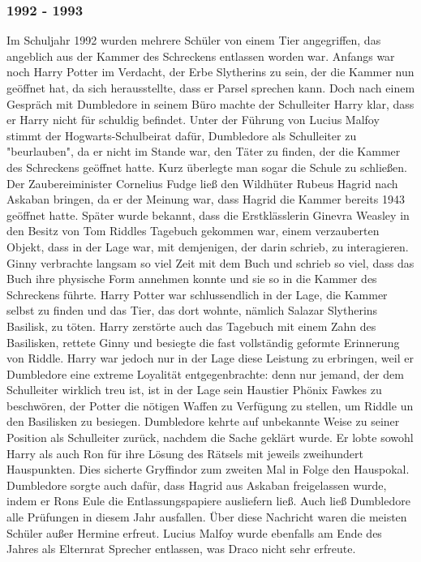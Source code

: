 \documentclass[a4paper, 10pt]{article}
\begin{document}
\subsubsection*{1992 - 1993}
Im Schuljahr 1992 wurden mehrere Schüler von einem Tier angegriffen, das angeblich aus der Kammer des Schreckens entlassen worden war. Anfangs war noch Harry Potter im Verdacht, der Erbe Slytherins zu sein, der die Kammer nun geöffnet hat, da sich herausstellte, dass er Parsel sprechen kann. Doch nach einem Gespräch mit Dumbledore in seinem Büro machte der Schulleiter Harry klar, dass er Harry nicht für schuldig befindet. Unter der Führung von Lucius Malfoy stimmt der Hogwarts-Schulbeirat dafür, Dumbledore als Schulleiter zu "beurlauben", da er nicht im Stande war, den Täter zu finden, der die Kammer des Schreckens geöffnet hatte. Kurz überlegte man sogar die Schule zu schließen. Der Zaubereiminister Cornelius Fudge ließ den Wildhüter Rubeus Hagrid nach Askaban bringen, da er der Meinung war, dass Hagrid die Kammer bereits 1943 geöffnet hatte.
\vspace{10pt}
\newline
{}  
Später wurde bekannt, dass die Erstklässlerin Ginevra Weasley in den Besitz von Tom Riddles Tagebuch gekommen war, einem verzauberten Objekt, dass in der Lage war, mit demjenigen, der darin schrieb, zu interagieren. Ginny verbrachte langsam so viel Zeit mit dem Buch und schrieb so viel, dass das Buch ihre physische Form annehmen konnte und sie so in die Kammer des Schreckens führte. Harry Potter war schlussendlich in der Lage, die Kammer selbst zu finden und das Tier, das dort wohnte, nämlich Salazar Slytherins Basilisk, zu töten. Harry zerstörte auch das Tagebuch mit einem Zahn des Basilisken, rettete Ginny und besiegte die fast vollständig geformte Erinnerung von Riddle. Harry war jedoch nur in der Lage diese Leistung zu erbringen, weil er Dumbledore eine extreme Loyalität entgegenbrachte: denn nur jemand, der dem Schulleiter wirklich treu ist, ist in der Lage sein Haustier Phönix Fawkes zu beschwören, der Potter die nötigen Waffen zu Verfügung zu stellen, um Riddle un den Basilisken zu besiegen.
\vspace{10pt}
\newline
{}  
Dumbledore kehrte auf unbekannte Weise zu seiner Position als Schulleiter zurück, nachdem die Sache geklärt wurde. Er lobte sowohl Harry als auch Ron für ihre Lösung des Rätsels mit jeweils zweihundert Hauspunkten. Dies sicherte Gryffindor zum zweiten Mal in Folge den Hauspokal. Dumbledore sorgte auch dafür, dass Hagrid aus Askaban freigelassen wurde, indem er Rons Eule die Entlassungspapiere ausliefern ließ. Auch ließ Dumbledore alle Prüfungen in diesem Jahr ausfallen. Über diese Nachricht waren die meisten Schüler außer Hermine erfreut. Lucius Malfoy wurde ebenfalls am Ende des Jahres als Elternrat Sprecher entlassen, was Draco nicht sehr erfreute.
\end{document}
